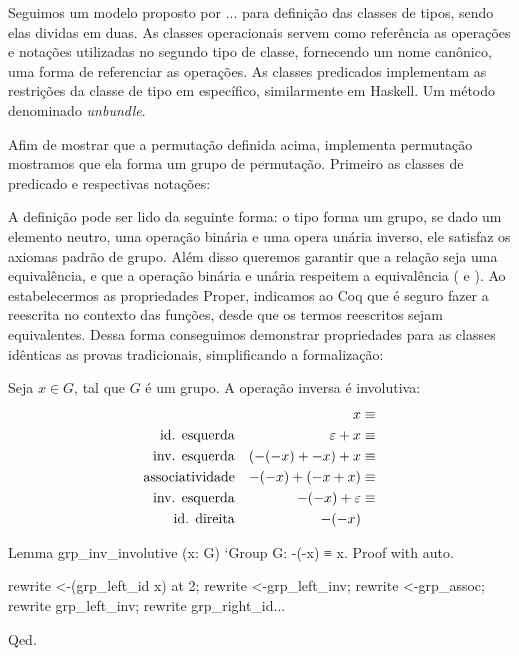 Seguimos um modelo proposto por ... para definição das classes de tipos, sendo elas dividas em duas. As classes operacionais servem como referência as operações e notações utilizadas no segundo tipo de classe, fornecendo um nome canônico, uma forma de referenciar as operações. As classes predicados implementam as restrições da classe de tipo em específico, similarmente em Haskell. Um método denominado \textit{unbundle}.

Afim de mostrar que a permutação definida acima, implementa permutação mostramos que ela forma um grupo de permutação. Primeiro as classes de predicado e respectivas notações:

A definição  pode ser lido da seguinte forma: o tipo  forma um grupo, se dado um elemento neutro, uma operação binária e uma opera unária inverso, ele satisfaz os axiomas padrão de grupo. Além disso queremos garantir que a relação seja uma equivalência, e que a operação binária e unária respeitem a equivalência ( e ). Ao estabelecermos as propriedades Proper, indicamos ao Coq que é seguro fazer a reescrita no contexto das funções, desde que os termos reescritos sejam equivalentes. Dessa forma conseguimos demonstrar propriedades para as classes idênticas as provas tradicionais, simplificando a formalização: 
\vspace*{.4em}\\
\begin{minipage}[t]{0.5\linewidth}
\begin{corolario}
Seja $x \in G$, tal que $G$ é um grupo. A operação inversa é involutiva:
\begin{align*}
                               & & x& \equiv\\
   \text{\textup{id. esquerda}}& & \varepsilon + x& \equiv\\
   \text{\textup{inv. esquerda}}& & (-(-x) + -x) + x& \equiv\\
   \text{\textup{associatividade}}& & -(-x) + (-x + x)& \equiv\\
   \text{\textup{inv. esquerda}}& & -(-x) + \varepsilon& \equiv\\
   \text{\textup{id. direita}}& & -(-x) &
\end{align*}
\end{corolario}
\end{minipage}
\hspace{1em}
\begin{minipage}[t]{0.5\linewidth}
\begin{coqcode}
Lemma grp_inv_involutive
  (x: G) `{Group G}: -(-x) ≡ x.
Proof with auto.


rewrite <-(grp_left_id x) at 2;
rewrite <-grp_left_inv;
rewrite <-grp_assoc;
rewrite grp_left_inv;
rewrite grp_right_id...

Qed.
\end{coqcode}
\end{minipage}

